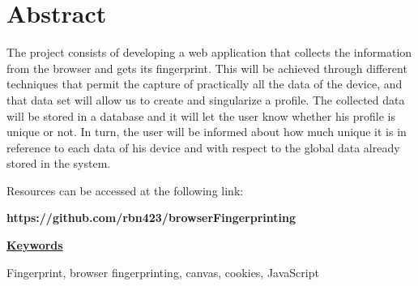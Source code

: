 \chapter*{Abstract}

The project consists of developing a web application that collects the information from the browser and gets its fingerprint. This will be achieved through different techniques that permit the capture of practically all the data of the device, and that data set will allow us to create and singularize a profile. The collected data will be stored in a database and it will let the user know whether his profile is unique or not. In turn, the user will be informed about how much unique it is in reference to each data of his device and with respect to the global data already stored in the system. \par

Resources can be accessed at the following link: \par
\noindent
\textbf{https://github.com/rbn423/browserFingerprinting} \par
\vspace{12mm}
\noindent
\underline{\Large{\textbf{Keywords}}}\par
\vspace{7mm}
\noindent
\normalsize{Fingerprint, browser fingerprinting, canvas, cookies, JavaScript}